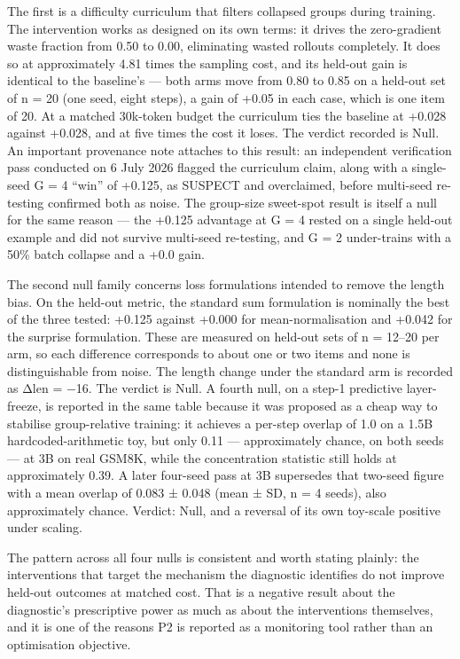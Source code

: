 \documentclass[12pt,a4paper]{report}
\begin{document}
The first is a difficulty curriculum that filters collapsed groups
during training. The intervention works as designed on its own terms: it
drives the zero-gradient waste fraction from 0.50 to 0.00, eliminating
wasted rollouts completely. It does so at approximately 4.81 times the
sampling cost, and its held-out gain is identical to the baseline's ---
both arms move from 0.80 to 0.85 on a held-out set of n = 20 (one seed,
eight steps), a gain of +0.05 in each case, which is one item of 20. At
a matched 30k-token budget the curriculum ties the baseline at +0.028
against +0.028, and at five times the cost it loses. The verdict
recorded is Null. An important provenance note attaches to this result:
an independent verification pass conducted on 6 July 2026 flagged the
curriculum claim, along with a single-seed G = 4 ``win'' of +0.125, as
SUSPECT and overclaimed, before multi-seed re-testing confirmed both as
noise. The group-size sweet-spot result is itself a null for the same
reason --- the +0.125 advantage at G = 4 rested on a single held-out
example and did not survive multi-seed re-testing, and G = 2
under-trains with a 50\% batch collapse and a +0.0 gain.

The second null family concerns loss formulations intended to remove the
length bias. On the held-out metric, the standard sum formulation is
nominally the best of the three tested: +0.125 against +0.000 for
mean-normalisation and +0.042 for the surprise formulation. These are
measured on held-out sets of n = 12--20 per arm, so each difference
corresponds to about one or two items and none is distinguishable from
noise. The length change under the standard arm is recorded as Δlen =
−16. The verdict is Null. A fourth null, on a step-1 predictive
layer-freeze, is reported in the same table because it was proposed as a
cheap way to stabilise group-relative training: it achieves a per-step
overlap of 1.0 on a 1.5B hardcoded-arithmetic toy, but only 0.11 ---
approximately chance, on both seeds --- at 3B on real GSM8K, while the
concentration statistic still holds at approximately 0.39. A later
four-seed pass at 3B supersedes that two-seed figure with a mean overlap
of 0.083 ± 0.048 (mean ± SD, n = 4 seeds), also approximately chance.
Verdict: Null, and a reversal of its own toy-scale positive under
scaling.

The pattern across all four nulls is consistent and worth stating
plainly: the interventions that target the mechanism the diagnostic
identifies do not improve held-out outcomes at matched cost. That is a
negative result about the diagnostic's prescriptive power as much as
about the interventions themselves, and it is one of the reasons P2 is
reported as a monitoring tool rather than an optimisation objective.
\end{document}
